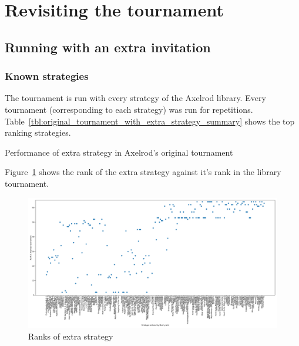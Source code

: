 \documentclass{article}
\begin{document}
\section{Revisiting the tournament}\label{sec:revisiting}

\subsection{Running with an extra invitation}\label{sec:extra_strategy}

\subsubsection{Known strategies}

The tournament is run with every strategy of the Axelrod library.
Every tournament (corresponding to each strategy) was run
for repetitions.
Table~\ref{tbl:original_tournament_with_extra_strategy_summary} shows the top
ranking strategies.

\begin{table}[!hbtp]
        \tiny
        \centering
        
        \caption{Performance of extra strategy in Axelrod's original tournament}
        \label{tbl:original_tournament_with_extra_strategy_summary}
\end{table}

Figure~\ref{fig:original_tournament_with_extra_strategy_ranks_vs_library_ranks}
shows the rank of the extra strategy against it's rank in the library
tournament.

\begin{figure}[!hbtp]
    \centering
    \includegraphics[width=.8\textwidth]{assets/original_tournament_with_extra_strategy_ranks_vs_library_ranks.pdf}
    \caption{Ranks of extra strategy}
    \label{fig:original_tournament_with_extra_strategy_ranks_vs_library_ranks}
\end{figure}
\end{document}
